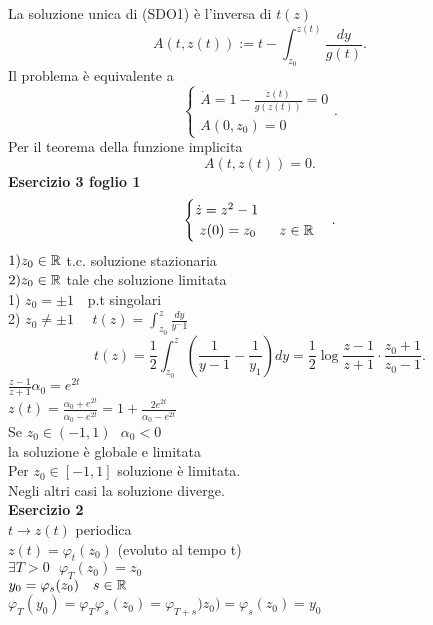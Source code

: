 \documentclass{article}
\begin{document}
  La soluzione unica di (SDO1) è l'inversa di $t(z)$\\
   \[
	   A(t,z(t)) := t - \int_{z_0}^{z(t)}\frac{dy}{g(t)}
  .\] 
  Il problema è equivalente a 
   \[
  \begin{cases}
	  \dot A = 1 - \frac{\dot z(t)}{g(z(t))} =0 \\
	  A(0,z_0) = 0
  \end{cases}
  .\] 
  Per il teorema della funzione implicita\\
  \[
  A(t,z(t)) = 0
  .\] 
  \textbf{Esercizio 3 foglio 1}\\
  \[
  \begin{cases}
  	\dot z = z^2 - 1\\\
	z(0) = z_0 \ \ \ \ \ z\in\mathbb{R}
  \end{cases}
  .\] 
  $1) z_0\in\mathbb{R}$ t.c. soluzione stazionaria\\
  $2) z_0\in \mathbb{R} $ tale che soluzione limitata
	\hline \ \\
	1) $z_0 = \pm 1\ \  \ $ p.t singolari\\
	2) $z_0 \neq \pm 1$ \ \ $t(z) = \int_{z_0}^z \frac {dy}{y^-1}$\\
	\[
		t(z) = \frac 12 \int_{z_0}^z \left(\frac{1}{y-1} - \frac{1}{y_1} \right) dy = \frac 12 \log\frac{z-1}{z+1}\cdot\frac{z_0 + 1}{z_0 - 1}
	.\] 
	$\frac{z-1}{z+1}\alpha_0 = e^{2t}$\\
	$z(t) = \frac{\alpha_0 + e^{2t}}{\alpha_0 - e^{2t}} = 1 + \frac{2e^{2t}}{\alpha_0 - e^{2t}}$ \\
	Se $z_0\in(-1,1) \ \ \ \alpha_0 < 0$\\
	la soluzione è globale e limitata\\
	Per $z_0\in[-1,1]$ soluzione è limitata.\\
	Negli altri casi la soluzione diverge.\\
	\textbf{Esercizio 2}\\
	$t \rightarrow z(t)$ periodica\\
	$z(t) = \varphi_t(z_0)$ (evoluto al tempo t)\\
	$\exists T > 0 \ \ \ \varphi_T(z_0) = z_0$\\
	$y_0 = \varphi_s (z_0) \ \ \ s\in\R$\\
	$ \varphi_T(y_0) = \varphi_T \varphi_s(z_0) = \varphi_{T+s})z_0) = \varphi_s(z_0) = y_0$
\end{document}
